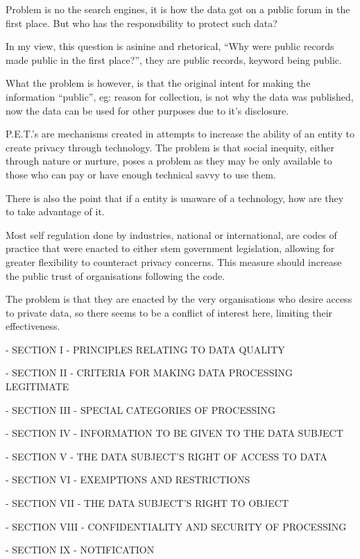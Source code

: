 Problem is no the search engines, it is how the data got on a public forum in the first place. But who has the responsibility to protect such data?


In my view, this question is asinine and rhetorical, ``Why were public records made public in the first place?'', they are public records, keyword being public.

What the problem is however, is that the original intent for making the information ``public'', eg: reason for collection, is not why the data was published, now the data can be used for other purposes due to it's disclosure.


P.E.T.'s are mechanisms created in attempts to increase the ability of an entity to create privacy through technology. The problem is that social inequity, either through nature or nurture, poses a problem as they may be only available to those who can pay or have enough technical savvy to use them.

There is also the point that if a entity is unaware of a technology, how are they to take advantage of it.


Most self regulation done by industries, national or international, are codes of practice that were enacted to either stem government legislation, allowing for greater flexibility to counteract privacy concerns. This measure should increase the public trust of organisations following the code.

The problem is that they are enacted by the very organisations who desire access to private data, so there seems to be a conflict of interest here, limiting their effectiveness.


\item - SECTION I - PRINCIPLES RELATING TO DATA QUALITY
\item - SECTION II - CRITERIA FOR MAKING DATA PROCESSING LEGITIMATE
\item - SECTION III - SPECIAL CATEGORIES OF PROCESSING
\item - SECTION IV - INFORMATION TO BE GIVEN TO THE DATA SUBJECT
\item - SECTION V - THE DATA SUBJECT'S RIGHT OF ACCESS TO DATA
\item - SECTION VI - EXEMPTIONS AND RESTRICTIONS
\item - SECTION VII - THE DATA SUBJECT'S RIGHT TO OBJECT
\item - SECTION VIII - CONFIDENTIALITY AND SECURITY OF PROCESSING
\item - SECTION IX - NOTIFICATION

